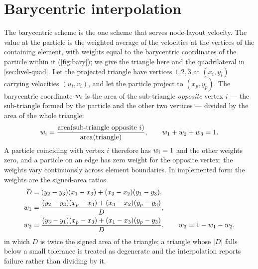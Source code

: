 
\section{Barycentric interpolation}\label{sec:hvel-bary}

The barycentric scheme is the one scheme that serves node-layout velocity. The value at the particle
is the weighted average of the velocities at the vertices of the containing element, with weights
equal to the barycentric coordinates of the particle within it (\cref{fig:bary}); we give the
triangle here and the quadrilateral in \cref{sec:hvel-quad}. Let the projected triangle have vertices $1,2,3$ at
$(x_i,y_i)$ carrying velocities $(u_i,v_i)$, and let the particle project to
$(x_p,y_p)$. The barycentric coordinate $w_{i}$ is the area of the sub-triangle
\emph{opposite} vertex $i$ --- the sub-triangle formed by the particle and the other
two vertices --- divided by the area of the whole triangle:
\begin{equation}\label{eq:bary-area}
  w_{i} = \frac{\operatorname{area}(\text{sub-triangle opposite } i)}
                 {\operatorname{area}(\text{triangle})}, \qquad
  w_{1}+w_{2}+w_{3}=1 .
\end{equation}
A particle coinciding with vertex $i$ therefore has $w_{i}=1$ and the other weights
zero, and a particle on an edge has zero weight for the opposite vertex; the weights
vary continuously across element boundaries. In implemented form the weights are the
signed-area ratios
\begin{align}\label{eq:bary-explicit}
  D    &= (y_2-y_3)(x_1-x_3)+(x_3-x_2)(y_1-y_3), \notag\\
  w_{1} &= \frac{(y_2-y_3)(x_p-x_3)+(x_3-x_2)(y_p-y_3)}{D}, \\
  w_{2} &= \frac{(y_3-y_1)(x_p-x_3)+(x_1-x_3)(y_p-y_3)}{D}, \qquad
  w_{3} = 1-w_{1}-w_{2}, \notag
\end{align}
in which $D$ is twice the signed area of the triangle; a triangle whose $|D|$ falls
below a small tolerance is treated as degenerate and the interpolation reports
failure rather than dividing by it.

